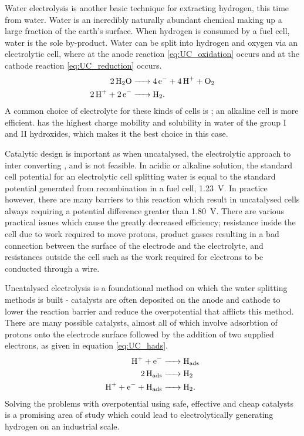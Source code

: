 Water electrolysis is another basic technique for extracting hydrogen, this time from water.
Water is an incredibly naturally abundant chemical making up a large fraction of the earth's surface.
When hydrogen is consumed by a fuel cell, water is the sole by-product.
Water can be split into hydrogen and oxygen via an electrolytic cell, where at the anode reaction \eqref{eq:UC_oxidation} occurs and at the cathode reaction \eqref{eq:UC_reduction} occurs.
\begin{align}
	\ce{2H2O &-> 4e- + 4H+ + O2} \label{eq:UC_oxidation} \\
	\ce{2H+ + 2e- &-> H2} \label{eq:UC_reduction}
.\end{align}
A common choice of electrolyte for these kinds of cells is ; an alkaline cell is more efficient\cite{merrill2006}.
 has the highest charge mobility and solubility in water of the group I and II hydroxides, which makes it the best choice in this case.

Catalytic design is important as when uncatalysed, the electrolytic approach to inter converting  ,  and   is not feasible.
In acidic or alkaline solution, the standard cell potential for an electrolytic cell splitting water is equal to the standard potential generated from recombination in a fuel cell, \SI{1.23}{\volt}\cite{Peng2020}.
In practice however, there are many barriers to this reaction which result in uncatalysed cells always requiring a potential difference greater than \SI{1.80}{\volt}.
There are various practical issues which cause the greatly decreased efficiency; resistance inside the cell due to work required to move protons, product gasses resulting in a bad connection between the surface of the electrode and the electrolyte, and resistances outside the cell such as the work required for electrons to be conducted through a wire.

Uncatalysed electrolysis is a foundational method on which the water splitting methods is built - catalysts are often deposited on the anode and cathode to lower the reaction barrier and reduce the overpotential that afflicts this method.
There are many possible catalysts, almost all of which involve adsorbtion of protons onto the electrode surface followed by the addition of two supplied electrons, as given in equation \eqref{eq:UC_hads}\cite{Leonard2012}.
\begin{align}
	\ce{H+ + e- &-> H_{ads}}\\
	\ce{2H_{ads} &-> H2}\\
	\ce{H+ + e- + H_{ads} &-> H2} \label{eq:UC_hads}
.\end{align}
Solving the problems with overpotential using safe, effective and cheap catalysts is a promising area of study which could lead to electrolytically generating hydrogen on an industrial scale.

